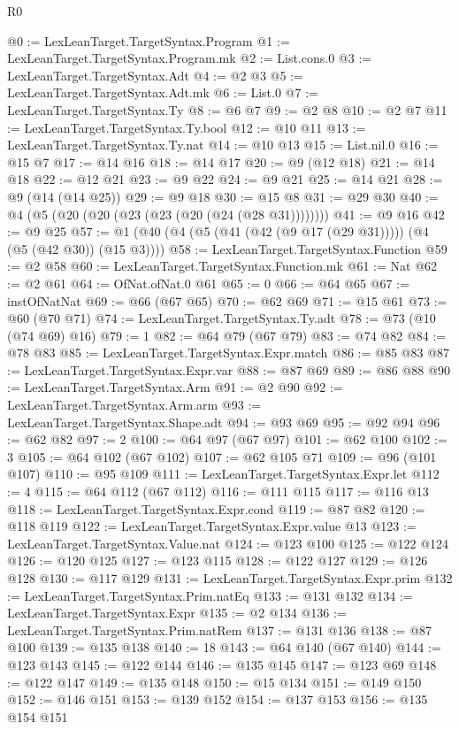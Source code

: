 \begin{lexlean}{R0}
\begin{coremodule}
@0 := LexLeanTarget.TargetSyntax.Program
@1 := LexLeanTarget.TargetSyntax.Program.mk
@2 := List.cons.{0}
@3 := LexLeanTarget.TargetSyntax.Adt
@4 := @2 @3
@5 := LexLeanTarget.TargetSyntax.Adt.mk
@6 := List.{0}
@7 := LexLeanTarget.TargetSyntax.Ty
@8 := @6 @7
@9 := @2 @8
@10 := @2 @7
@11 := LexLeanTarget.TargetSyntax.Ty.bool
@12 := @10 @11
@13 := LexLeanTarget.TargetSyntax.Ty.nat
@14 := @10 @13
@15 := List.nil.{0}
@16 := @15 @7
@17 := @14 @16
@18 := @14 @17
@20 := @9 (@12 @18)
@21 := @14 @18
@22 := @12 @21
@23 := @9 @22
@24 := @9 @21
@25 := @14 @21
@28 := @9 (@14 (@14 @25))
@29 := @9 @18
@30 := @15 @8
@31 := @29 @30
@40 := @4 (@5 (@20 (@20 (@23 (@23 (@20 (@24 (@28 @31))))))))
@41 := @9 @16
@42 := @9 @25
@57 := @1 (@40 (@4 (@5 (@41 (@42 (@9 @17 (@29 @31))))) (@4 (@5 (@42 @30)) (@15 @3))))
@58 := LexLeanTarget.TargetSyntax.Function
@59 := @2 @58
@60 := LexLeanTarget.TargetSyntax.Function.mk
@61 := Nat
@62 := @2 @61
@64 := OfNat.ofNat.{0} @61
@65 := 0
@66 := @64 @65
@67 := instOfNatNat
@69 := @66 (@67 @65)
@70 := @62 @69
@71 := @15 @61
@73 := @60 (@70 @71)
@74 := LexLeanTarget.TargetSyntax.Ty.adt
@78 := @73 (@10 (@74 @69) @16)
@79 := 1
@82 := @64 @79 (@67 @79)
@83 := @74 @82
@84 := @78 @83
@85 := LexLeanTarget.TargetSyntax.Expr.match
@86 := @85 @83
@87 := LexLeanTarget.TargetSyntax.Expr.var
@88 := @87 @69
@89 := @86 @88
@90 := LexLeanTarget.TargetSyntax.Arm
@91 := @2 @90
@92 := LexLeanTarget.TargetSyntax.Arm.arm
@93 := LexLeanTarget.TargetSyntax.Shape.adt
@94 := @93 @69
@95 := @92 @94
@96 := @62 @82
@97 := 2
@100 := @64 @97 (@67 @97)
@101 := @62 @100
@102 := 3
@105 := @64 @102 (@67 @102)
@107 := @62 @105 @71
@109 := @96 (@101 @107)
@110 := @95 @109
@111 := LexLeanTarget.TargetSyntax.Expr.let
@112 := 4
@115 := @64 @112 (@67 @112)
@116 := @111 @115
@117 := @116 @13
@118 := LexLeanTarget.TargetSyntax.Expr.cond
@119 := @87 @82
@120 := @118 @119
@122 := LexLeanTarget.TargetSyntax.Expr.value @13
@123 := LexLeanTarget.TargetSyntax.Value.nat
@124 := @123 @100
@125 := @122 @124
@126 := @120 @125
@127 := @123 @115
@128 := @122 @127
@129 := @126 @128
@130 := @117 @129
@131 := LexLeanTarget.TargetSyntax.Expr.prim
@132 := LexLeanTarget.TargetSyntax.Prim.natEq
@133 := @131 @132
@134 := LexLeanTarget.TargetSyntax.Expr
@135 := @2 @134
@136 := LexLeanTarget.TargetSyntax.Prim.natRem
@137 := @131 @136
@138 := @87 @100
@139 := @135 @138
@140 := 18
@143 := @64 @140 (@67 @140)
@144 := @123 @143
@145 := @122 @144
@146 := @135 @145
@147 := @123 @69
@148 := @122 @147
@149 := @135 @148
@150 := @15 @134
@151 := @149 @150
@152 := @146 @151
@153 := @139 @152
@154 := @137 @153
@156 := @135 @154 @151

\end{coremodule}
\end{lexlean}
